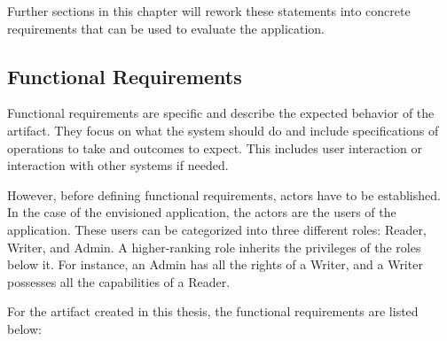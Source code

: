 Further sections in this chapter will rework these statements into concrete requirements that can be used to evaluate the application.

\subsection{Functional Requirements}

Functional requirements are specific and describe the expected behavior of the artifact. 
They focus on what the system should do and include specifications of operations 
to take and outcomes to expect. 
This includes user interaction or interaction with other systems if needed. 

However, before defining functional requirements, actors have to be established. 
In the case of the envisioned application, the actors are the users of the application.
These users can be categorized into three different roles: Reader, Writer, and Admin. 
A higher-ranking role inherits the privileges of the roles below it. 
For instance, an Admin has all the rights of a Writer,
and a Writer possesses all the capabilities of a Reader.

For the artifact created in this thesis, the functional requirements are listed below: 




